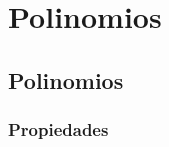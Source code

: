 \documentclass[12pt, fleqn]{report}                             %
\begin{document}
\chapter{Polinomios}
    \clearpage

    \section{Polinomios}



        \subsection*{Propiedades}
\end{document}
